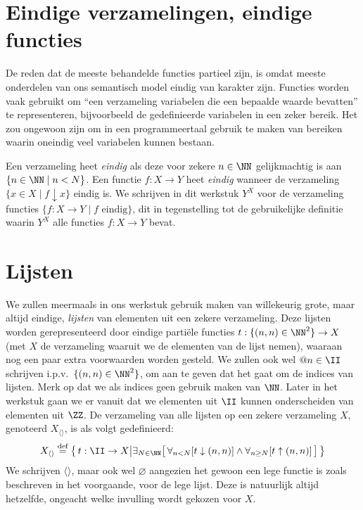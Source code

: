\section{Eindige verzamelingen, eindige functies}
\label{sec:eindigefuncties}

De reden dat de meeste behandelde functies partieel zijn, is omdat meeste onderdelen van ons semantisch model eindig van karakter zijn. Functies worden vaak gebruikt om “een verzameling variabelen die een bepaalde waarde bevatten” te representeren, bijvoorbeeld de gedefinieerde variabelen in een zeker bereik. Het zou ongewoon zijn om in een programmeertaal gebruik te maken van bereiken waarin oneindig veel variabelen kunnen bestaan.

Een verzameling heet \emph{eindig} als deze voor zekere $n \in \NN$ gelijkmachtig is aan $\{n \in \NN \mid n < N\}$.
Een functie $f: X \to Y$ heet \emph{eindig} wanneer de verzameling $\{x \in X \mid f \downarrow x\}$ eindig is.
We schrijven in dit werkstuk $Y^X$ voor de verzameling functies $\{f : X \to Y \mid f \text{ eindig} \}$, dit in tegenstelling tot de gebruikelijke definitie waarin $Y^X$ alle functies $f : X \to Y$ bevat.

\section{Lijsten}
\label{sec:lijsten}

We zullen meermaals in ons werkstuk gebruik maken van willekeurig grote, maar altijd eindige, \emph{lijsten} van elementen uit een zekere verzameling. Deze lijsten worden gerepresenteerd door eindige partiële functies $t : \{(n, n) \in \NN^2\} \to X$ (met $X$ de verzameling waaruit we de elementen van de lijst nemen), waaraan nog een paar extra voorwaarden worden gesteld. We zullen ook wel $@n \in \II$ schrijven i.p.v.~$\{(n, n) \in \NN^2\}$, om aan te geven dat het gaat om de indices van lijsten. Merk op dat we als indices geen gebruik maken van $\NN$. Later in het werkstuk gaan we er vanuit dat we elementen uit $\II$ kunnen onderscheiden van elementen uit $\ZZ$. De verzameling van alle lijsten op een zekere verzameling $X$, genoteerd $X_{\langle\rangle}$, is als volgt gedefinieerd:
\begin{equation*}
X_{\langle\rangle} \DEF \big\{\, t : \II \to X \big\vert \exists_{N \in \NN} \surr{ \forall_{n < N}[t \downarrow (n, n)] \land \forall_{n\ge N}[t \uparrow (n, n)] } \,\big\}
\end{equation*}
We schrijven $\langle\rangle$, maar ook wel $\varnothing$ aangezien het gewoon een lege functie is zoals beschreven in het voorgaande, voor de lege lijst. Deze is natuurlijk altijd hetzelfde, ongeacht welke invulling wordt gekozen voor $X$.

